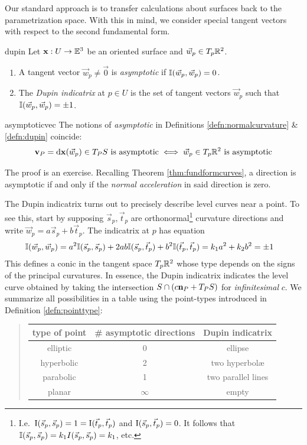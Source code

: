
Our standard approach is to transfer calculations about surfaces back to the parametrization space. With this in mind, we consider special tangent vectors with respect to the second fundamental form.

\begin{defn}{}{dupin}
	Let ${\mathbf{x}}:U\to\mathbb{E}^3$ be an oriented surface and $\vec w_p\in T_p\mathbb{R}^2$.
	\begin{enumerate}
	  \item A tangent vector $\vec w_p\neq\vec 0$ is \emph{asymptotic} if $\mathbb{I}(\vec w_p,\vec w_p)=0$.
	  \item The \emph{Dupin indicatrix} at $p\in U$ is the set of tangent vectors $\vec w_p$ such that $\mathbb{I}(\vec w_p,\vec w_p)=\pm 1$.
	\end{enumerate}
\end{defn}

\begin{thm}{}{asymptoticvec}
	The notions of \emph{asymptotic} in Definitions \ref{defn:normalcurvature} \& \ref{defn:dupin} coincide:
	\[
		{\mathbf{v}}_P=\mathrm{d}{\mathbf{x}}(\vec w_p)\in T_PS\text{ is asymptotic}\iff \vec w_p\in T_p\mathbb{R}^2 \text{ is asymptotic}
	\]
\end{thm}

The proof is an exercise. Recalling Theorem \ref{thm:fundformcurves}, a direction is asymptotic if and only if the \emph{normal acceleration} in said direction is zero.\smallbreak

The Dupin indicatrix turns out to precisely describe level curves near a point. To see this, start by supposing $\vec s_p,\vec t_p$ are orthonormal\footnote{I.e.\ $\mathrm{I}(\vec s_p,\vec s_p)=1=\mathrm{I}(\vec t_p,\vec t_p)$ and $\mathrm{I}(\vec s_p,\vec t_p)=0$. It follows that $\mathbb{I}(\vec s_p,\vec s_p)=k_1I(\vec s_p,\vec s_p)=k_1$, etc.} curvature directions and write $\vec w_p=a\vec s_p+b\vec t_p$. The indicatrix at $p$ has equation
\begin{align*}
	\mathbb{I}(\vec w_p,\vec w_p)&=a^2\mathbb{I}(\vec s_p,\vec s_p) +2ab\mathbb{I}(\vec s_p,\vec t_p) + b^2\mathbb{I}(\vec t_p,\vec t_p) =k_1a^2+k_2b^2=\pm 1
\end{align*}
This defines a conic in the tangent space $T_p\mathbb{R}^2$ whose type depends on the signs of the principal curvatures. In essence, the Dupin indicatrix indicates the level curve obtained by taking the intersection $S\cap (c{\mathbf{n}}_P+T_PS)$ for \emph{infinitesimal} $c$. We summarize all possibilities in a table using the point-types introduced in Definition \ref{defn:pointtype}:
\begin{quote}
	\begin{tabular}{c|c|c}
		type of point&\# asymptotic directions&Dupin indicatrix\\\hline
		elliptic&0&ellipse\\
		hyperbolic&2&two hyperbolæ\\
		parabolic&1&two parallel lines\\
		planar&$\infty$&empty
	\end{tabular}
\end{quote}


